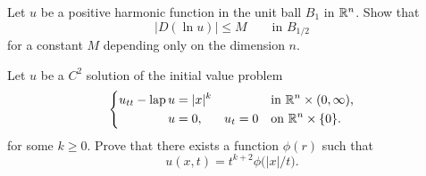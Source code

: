 \begin{problem}
  Let \(u\) be a positive harmonic function in the unit ball \(B_1\) in
  \(\mathbb{R}^n\). Show that
  \[
    \bigl|D(\ln u)\bigr|\leq M\qquad \text{in \(B_{1/2}\)}
  \]
  for a constant \(M\) depending only on the dimension \(n\).

\end{problem}
\begin{solution*}
\end{solution*}

\begin{problem}
  Let \(u\) be a \(C^2\) solution of the initial value problem
  \[
    \left\{
    \begin{aligned}
      u_{tt}-\operatorname{lap} u&=|x|^k&&&&\text{in \(\mathbb{R}^n\times(0,\infty)\),}\\
      u&=0,&u_t&=0&&\text{on \(\mathbb{R}^n\times\{0\}\)}.
    \end{aligned}
    \right.
  \]
  for some \(k\geq 0\). Prove that there exists a function \(\phi(r)\)
  such that
  \[
    u(x,t)=t^{k+2}\phi\bigl(|x|/t\bigr).
  \]

  \noindent [\emph{Hint:} As one of the steps show that \(u\) is
  \((k+2)\)-homogeneous in \((x,t)\) variables, i.e.,
  \(u(\lambda x,\lambda t)=\lambda^{k+2}u(x,t)\) for any \(\lambda >0\).]
\end{problem}
\begin{solution*}
\end{solution*}

